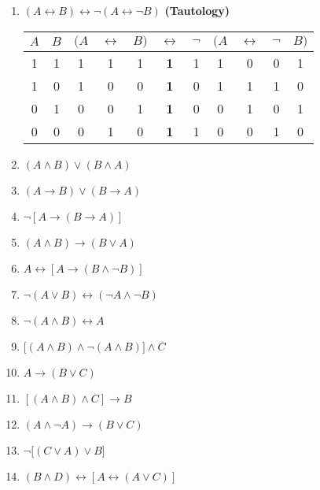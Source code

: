 \documentclass[12pt, letterpaper, twoside]{article}
\newcommand*{\TTon}{\hspace{1.5em}\extracolsep{-1em}}
\newcommand*{\TToff}{\extracolsep{-1em}\hspace{.3em}}
\newcommand*{\TTbf}[1]{\textbf{\large #1}}
\begin{document}
\begin{enumerate}
	\item $(A \leftrightarrow B) \leftrightarrow
          \neg(A\leftrightarrow \neg B)$
          \textbf{(Tautology)}
	
	\begin{center}
	\begin{tabular}{c|c|@{\TTon}*{9}{c}@{\TToff}}
	$A$ & $B$ & $(A$ & $\leftrightarrow$ & $B)$ &
          $\leftrightarrow$ & $\neg$ & $(A$ &
          $\leftrightarrow$ & $\neg$ & $B)$ \\ \hline 1 & 1
          & 1 & 1 & 1 & \TTbf{1} & 1 & 1 & 0 & 0 & 1 \\ 1 &
          0 & 1 & 0 & 0 & \TTbf{1} & 0 & 1 & 1 & 1 & 0 \\ 0
          & 1 & 0 & 0 & 1 & \TTbf{1} & 0 & 0 & 1 & 0 & 1
          \\ 0 & 0 & 0 & 1 & 0 & \TTbf{1} & 1 & 0 & 0 & 1 &
          0
	\end{tabular}
	\end{center}
	
	\item $(A\wedge B) \vee (B\wedge A)$
	\item $(A \rightarrow B) \vee (B \rightarrow A)$
	\item $\neg[A \rightarrow (B \rightarrow A)]$
	\item $(A \wedge B) \rightarrow (B \vee A)$
	\item $A \leftrightarrow [A \rightarrow (B \wedge
          \neg B)]$
	\item $\neg(A \vee B) \leftrightarrow (\neg A \wedge
          \neg B)$
	\item $\neg(A\wedge B) \leftrightarrow A$
	\item $\bigl[(A\wedge B) \wedge\neg(A\wedge B)\bigr]
          \wedge C$
	\item $A\rightarrow(B\vee C)$
	\item $[(A \wedge B) \wedge C] \rightarrow B$
	\item $(A \wedge\neg A) \rightarrow (B \vee C)$
	\item $\neg\bigl[(C\vee A) \vee B\bigr]$
	\item $(B\wedge D) \leftrightarrow [A
          \leftrightarrow(A \vee C)]$
\end{enumerate}
\end{document}
